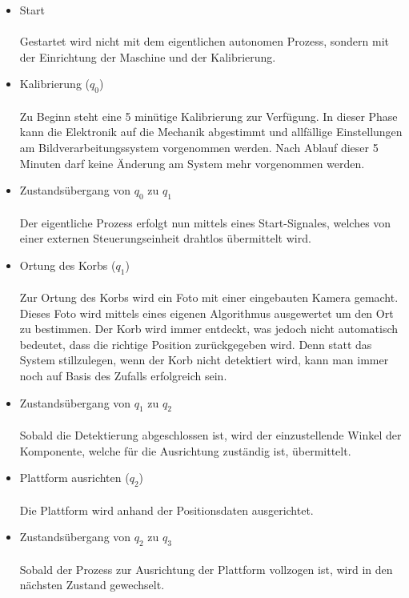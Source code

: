 \begin{itemize}
	
	\item Start \\ \\
		  Gestartet wird nicht mit dem eigentlichen autonomen Prozess, sondern mit der Einrichtung der Maschine und der Kalibrierung.
	
	\item Kalibrierung ($q_{0}$) \\ \\
	      Zu Beginn steht eine 5 minütige Kalibrierung zur Verfügung. In dieser Phase kann die Elektronik auf die Mechanik abgestimmt und allfällige Einstellungen am Bildverarbeitungssystem vorgenommen werden. Nach Ablauf dieser 5 Minuten darf keine Änderung am System mehr vorgenommen werden.
		
	\item Zustandsübergang von $q_{0}$ zu $q_{1}$ \\ \\
		  Der eigentliche Prozess erfolgt nun mittels eines Start-Signales, welches von einer externen Steuerungseinheit drahtlos übermittelt wird.
		
	\item Ortung des Korbs ($q_{1}$) \\ \\
		  Zur Ortung des Korbs wird ein Foto mit einer eingebauten Kamera gemacht. Dieses Foto wird mittels eines eigenen Algorithmus ausgewertet um den Ort zu bestimmen. Der Korb wird immer entdeckt, was jedoch nicht automatisch bedeutet, dass die richtige Position zurückgegeben wird. Denn statt das System stillzulegen, wenn der Korb nicht detektiert wird, kann man immer noch auf Basis des Zufalls erfolgreich sein.

	\newpage
		  
	\item Zustandsübergang von $q_{1}$ zu $q_{2}$ \\ \\
		  Sobald die Detektierung abgeschlossen ist, wird der einzustellende Winkel der Komponente, welche für die Ausrichtung zuständig ist, übermittelt.
		  
	\item Plattform ausrichten ($q_{2}$) \\ \\
		  Die Plattform wird anhand der Positionsdaten ausgerichtet.
		  
	\item Zustandsübergang von $q_{2}$ zu $q_{3}$ \\ \\
		  Sobald der Prozess zur Ausrichtung der Plattform vollzogen ist, wird in den nächsten Zustand gewechselt.
		  

\end{itemize}

